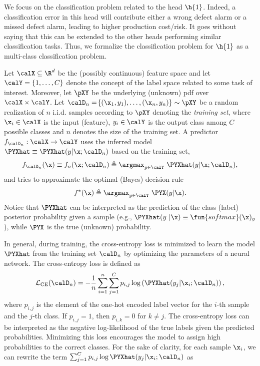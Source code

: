 We focus on the classification problem related to the head \(\h{1}\). Indeed, a classification error in this head will contribute either a wrong defect alarm or a missed defect alarm, leading to higher production cost/risk. It goes without saying that this can be extended to the other heads performing similar classification tasks.
Thus, we formalize the classification problem for \(\h{1}\) as a multi-class classification problem.

Let \(\calX\subseteq\R^d\) be the (possibly continuous) feature space and let  \(\calY=\{1,\dots,C\}\) denote the concept of the label space related to some task of interest. Moreover, let \(\pXY\) be the underlying (unknown) \gls*{pdf} over \(\calX\times\calY\).
Let \(\calD_{n} = \!\left\{( \x_1, y_1),\dots,( \x_n, y_n)\right\}\sim \pXY\) be a random realization of $n$ i.i.d. samples according to \(\pXY\)  denoting the \textit{training set}, where \(\x_i \in \calX\) is the input (feature), \(y_i \in \calY\) is the output class among $C$ possible classes and $n$ denotes the size of the training set. A predictor \({f}_{\calD_{n}}: \calX\rightarrow\calY\) uses the inferred model \(\PYXhat\equiv \PYXhat(y|\x;\calD_{n})\) based on the training set,
\[
    f_{\calD_{n}}(\x) \equiv  f_{{n}}(\x;\calD_{n}) \triangleq \argmax_{y\in\calY}~\PYXhat(y|\x;\calD_{n}),
\]
and tries to approximate the optimal (Bayes) decision rule
\[
    f^\star(\x)  \triangleq   \argmax_{y\in\calY}~\PYX(y|\x).
\]
Notice that $\PYXhat$ can be interpreted as the prediction of the class (label) posterior probability given a sample (e.g., \(\PYXhat(y~|\x)\equiv \fun{softmax}(\mathbf{\x})_y\)), while \(\PYX\) is the true (unknown)  probability.

In general, during training, the cross-entropy loss is minimized to learn the model \(\PYXhat\) from the training set \(\calD_n\) by optimizing the parameters of a neural network. The cross-entropy loss is defined as
\[
    \mathcal{L}_{\text{CE}}(\calD_n) = -\frac{1}{n}\sum_{i=1}^{n}\sum_{j=1}^{C} p_{i,j}\log\left(\PYXhat(y_j|\x_i;\calD_n)\right),
\]
where \(p_{i,j}\) is the element of the one-hot encoded label vector for the \(i\)-th sample and the \(j\)-th class. If \(p_{i,j} = 1\), then \(p_{i,k} = 0\) for \(k \neq j\). The cross-entropy loss can be interpreted as the negative log-likelihood of the true labels given the predicted probabilities. Minimizing this loss encourages the model to assign high probabilities to the correct classes.
For the sake of clarity, for each sample \(\x_i\), we can rewrite the term \(\sum_{j=1}^{C} p_{i,j}\log \PYXhat(y_j|\x_i;\calD_n)\) as


